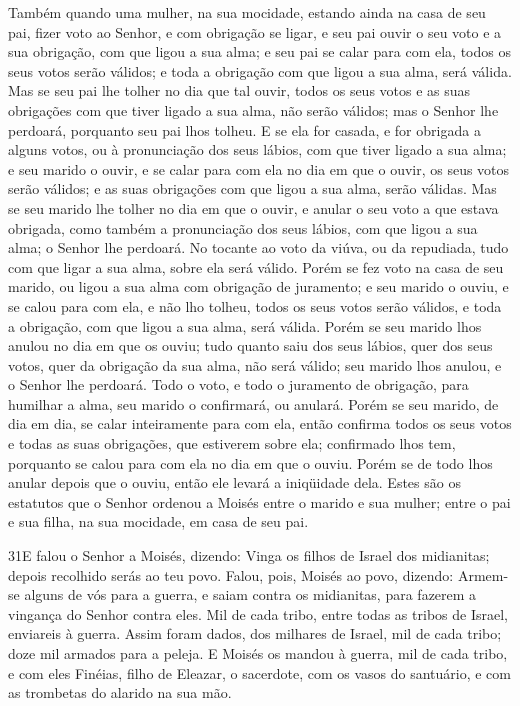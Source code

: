 Também quando uma mulher, na sua mocidade, estando ainda na casa
de seu pai, fizer voto ao Senhor, e com obrigação se ligar, e
seu pai ouvir o seu voto e a sua obrigação, com que ligou a sua
alma; e seu pai se calar para com ela, todos os seus votos serão
válidos; e toda a obrigação com que ligou a sua alma, será válida.
Mas se seu pai lhe tolher no dia que tal ouvir, todos os seus
votos e as suas obrigações com que tiver ligado a sua alma, não
serão válidos; mas o Senhor lhe perdoará, porquanto seu pai lhos
tolheu. E se ela for casada, e for obrigada a alguns votos, ou à
pronunciação dos seus lábios, com que tiver ligado a sua alma; e
seu marido o ouvir, e se calar para com ela no dia em que o ouvir,
os seus votos serão válidos; e as suas obrigações com que ligou a
sua alma, serão válidas. Mas se seu marido lhe tolher no dia em
que o ouvir, e anular o seu voto a que estava obrigada, como também
a pronunciação dos seus lábios, com que ligou a sua alma; o Senhor
lhe perdoará. No tocante ao voto da viúva, ou da repudiada, tudo
com que ligar a sua alma, sobre ela será válido. Porém se fez
voto na casa de seu marido, ou ligou a sua alma com obrigação de
juramento; e seu marido o ouviu, e se calou para com ela, e
não lho tolheu, todos os seus votos serão válidos, e toda a
obrigação, com que ligou a sua alma, será válida. Porém se
seu marido lhos anulou no dia em que os ouviu; tudo quanto saiu dos
seus lábios, quer dos seus votos, quer da obrigação da sua alma, não
será válido; seu marido lhos anulou, e o Senhor lhe perdoará.
Todo o voto, e todo o juramento de obrigação, para humilhar a
alma, seu marido o confirmará, ou anulará. Porém se seu
marido, de dia em dia, se calar inteiramente para com ela, então
confirma todos os seus votos e todas as suas obrigações, que
estiverem sobre ela; confirmado lhos tem, porquanto se calou para
com ela no dia em que o ouviu. Porém se de todo lhos anular
depois que o ouviu, então ele levará a iniqüidade dela. Estes
são os estatutos que o Senhor ordenou a Moisés entre o marido e sua
mulher; entre o pai e sua filha, na sua mocidade, em casa de seu
pai.

\medskip

\lettrine{31} E falou o Senhor a Moisés, dizendo: Vinga os
filhos de Israel dos midianitas; depois recolhido serás ao teu povo.
Falou, pois, Moisés ao povo, dizendo: Armem-se alguns de vós
para a guerra, e saiam contra os midianitas, para fazerem a vingança
do Senhor contra eles. Mil de cada tribo, entre todas as tribos
de Israel, enviareis à guerra. Assim foram dados, dos milhares
de Israel, mil de cada tribo; doze mil armados para a peleja. E
Moisés os mandou à guerra, mil de cada tribo, e com eles Finéias,
filho de Eleazar, o sacerdote, com os vasos do santuário, e com as
trombetas do alarido na sua mão.

